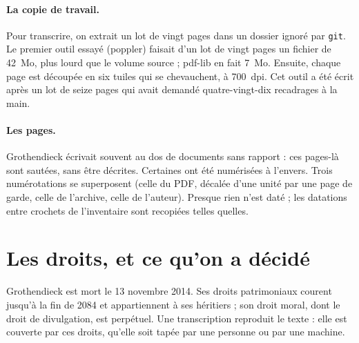 \paragraph{La copie de travail.} Pour transcrire, on extrait un lot de vingt pages dans un
dossier ignoré par \texttt{git}. Le premier outil essayé (poppler) faisait d'un lot de
vingt pages un fichier de 42~Mo, plus lourd que le volume source ; pdf-lib en fait 7~Mo.
Ensuite, chaque page est découpée en six tuiles qui se chevauchent, à 700~dpi. Cet outil a
été écrit après un lot de seize pages qui avait demandé quatre-vingt-dix recadrages à la
main.

\paragraph{Les pages.} Grothendieck écrivait souvent au dos de documents sans rapport : ces
pages-là sont sautées, sans être décrites. Certaines ont été numérisées à l'envers. Trois
numérotations se superposent (celle du PDF, décalée d'une unité par une page de garde,
celle de l'archive, celle de l'auteur). Presque rien n'est daté ; les datations entre
crochets de l'inventaire sont recopiées telles quelles.

\section{Les droits, et ce qu'on a décidé}

Grothendieck est mort le 13 novembre 2014. Ses droits patrimoniaux courent jusqu'à la fin
de 2084 et appartiennent à ses héritiers ; son droit moral, dont le droit de divulgation,
est perpétuel. Une transcription reproduit le texte : elle est couverte par ces droits,
qu'elle soit tapée par une personne ou par une machine.

